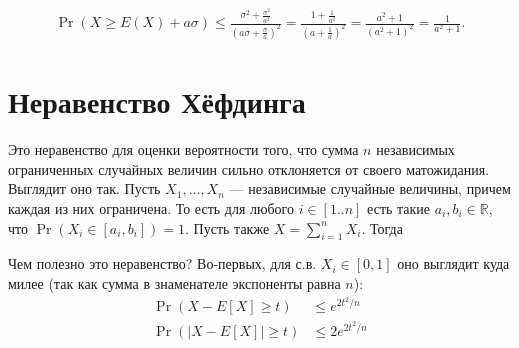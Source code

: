 \documentclass[12pt]{article}
\newcommand\R{\mathbb{R}}
\begin{document}
\begin{align*}
  \Pr(X \ge E(X) + a\sigma) \le \frac{\sigma^2+ \frac{\sigma^2}{a^2}}{(a\sigma + \frac{\sigma}{a})^2} = \frac{1 + \frac{1}{a^2}}{\left(a + \frac{1}{a}\right)^2} = \frac{a^2 + 1}{(a^2 + 1)^2} = \frac{1}{a^2 + 1}.
\end{align*}

\section{Неравенство Хёфдинга}

Это неравенство для оценки вероятности того, что сумма $n$ независимых ограниченных случайных величин сильно отклоняется от своего матожидания. Выглядит оно так. Пусть $X_1, \dots, X_n$ --- независимые случайные величины, причем каждая из них ограничена. То есть для любого $i \in [1..n]$ есть такие $a_i, b_i \in \R$, что $\Pr(X_i \in [a_i, b_i]) = 1$. Пусть также $X = \sum_{i = 1}^n X_i$. Тогда
\begin{center}
\end{center}
\begin{center}
\end{center}

Чем полезно это неравенство? Во-первых, для с.в. $X_i \in [0, 1]$ оно выглядит куда милее (так как сумма в знаменателе экспоненты равна $n$):
\begin{align*}
  \Pr(X - E[X] \ge t) &\le e^{2t^2/n} \\
  \Pr(|X - E[X]| \ge t) &\le 2e^{2t^2/n}
\end{align*}
\end{document}
